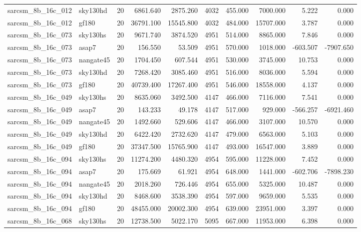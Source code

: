 \documentclass{article}
\begin{document}
\begin{longtable}{llrrrrrrrr}
sarcsm\_8b\_16c\_012 & sky130hd & 20 & 6861.640 & 2875.260 & 4032 & 455.000 & 7000.000 & 5.222 & 0.000 \\
sarcsm\_8b\_16c\_012 & gf180 & 20 & 36791.100 & 15545.800 & 4032 & 484.000 & 15707.000 & 3.787 & 0.000 \\
sarcsm\_8b\_16c\_073 & sky130hs & 20 & 9671.740 & 3874.520 & 4951 & 514.000 & 8865.000 & 7.846 & 0.000 \\
sarcsm\_8b\_16c\_073 & asap7 & 20 & 156.550 & 53.509 & 4951 & 570.000 & 1018.000 & -603.507 & -7907.650 \\
sarcsm\_8b\_16c\_073 & nangate45 & 20 & 1704.450 & 607.544 & 4951 & 530.000 & 3745.000 & 10.753 & 0.000 \\
sarcsm\_8b\_16c\_073 & sky130hd & 20 & 7268.420 & 3085.460 & 4951 & 516.000 & 8036.000 & 5.594 & 0.000 \\
sarcsm\_8b\_16c\_073 & gf180 & 20 & 40739.400 & 17267.400 & 4951 & 546.000 & 18558.000 & 4.137 & 0.000 \\
sarcsm\_8b\_16c\_049 & sky130hs & 20 & 8635.060 & 3492.500 & 4147 & 466.000 & 7116.000 & 7.541 & 0.000 \\
sarcsm\_8b\_16c\_049 & asap7 & 20 & 143.233 & 49.178 & 4147 & 517.000 & 929.000 & -566.257 & -6921.460 \\
sarcsm\_8b\_16c\_049 & nangate45 & 20 & 1492.660 & 529.606 & 4147 & 466.000 & 3107.000 & 10.570 & 0.000 \\
sarcsm\_8b\_16c\_049 & sky130hd & 20 & 6422.420 & 2732.620 & 4147 & 479.000 & 6563.000 & 5.103 & 0.000 \\
sarcsm\_8b\_16c\_049 & gf180 & 20 & 37347.500 & 15765.900 & 4147 & 493.000 & 16547.000 & 3.889 & 0.000 \\
sarcsm\_8b\_16c\_094 & sky130hs & 20 & 11274.200 & 4480.320 & 4954 & 595.000 & 11228.000 & 7.452 & 0.000 \\
sarcsm\_8b\_16c\_094 & asap7 & 20 & 175.669 & 61.921 & 4954 & 648.000 & 1441.000 & -602.706 & -7898.230 \\
sarcsm\_8b\_16c\_094 & nangate45 & 20 & 2018.260 & 726.446 & 4954 & 655.000 & 5325.000 & 10.487 & 0.000 \\
sarcsm\_8b\_16c\_094 & sky130hd & 20 & 8468.600 & 3538.390 & 4954 & 597.000 & 9659.000 & 5.535 & 0.000 \\
sarcsm\_8b\_16c\_094 & gf180 & 20 & 48455.000 & 20002.300 & 4954 & 639.000 & 23951.000 & 3.397 & 0.000 \\
sarcsm\_8b\_16c\_068 & sky130hs & 20 & 12738.500 & 5022.170 & 5095 & 667.000 & 11953.000 & 6.398 & 0.000 \\

\end{longtable}
\end{document}
